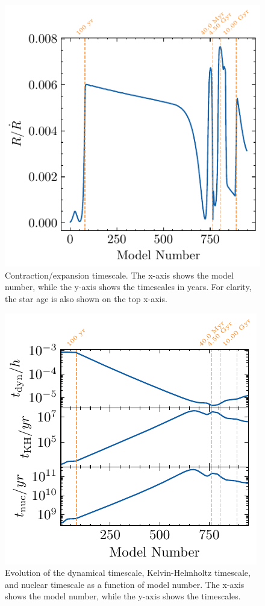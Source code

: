 \documentclass[twocolumn,fontsize=11pt]{scrartcl}
\begin{document}
\begin{figure}[htbp]
    \centering
    \includegraphics{R_dot_vs_model_number.pdf}
    \caption{Contraction/expansion timescale. The x-axis shows the model number, while the y-axis shows the timescales in years. For clarity, the star age is also shown on the top x-axis.}
    \label{fig:q14_timescales}
\end{figure}
\begin{figure}[htbp]
    \centering
    \includegraphics{timescales_vs_model_number.pdf}
    \caption{Evolution of the dynamical timescale, Kelvin-Helmholtz timescale, and nuclear timescale as a function of model number. The x-axis shows the model number, while the y-axis shows the timescales. }
    \label{fig:q15_timescales}
\end{figure}
\end{document}

